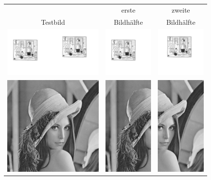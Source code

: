\documentclass[12pt,german]{article}
\begin{document}
\begin{table}[H]
  \centering
  \begin{tabular}{| c | c | c |}
	\hline
	 & erste & zweite \\	
	Testbild & Bildhälfte & Bildhälfte \\ 
    \hline
    \includegraphics[width=5cm]{images/chop/binary1.jpg} &
    \includegraphics[width=2.5cm]{images/chop/binary1FH.jpg} &
    \includegraphics[width=2.5cm]{images/chop/binary1SH.jpg} \\
    \hline
    \includegraphics[width=5cm]{images/chop/lena.jpg} &
    \includegraphics[width=2.5cm]{images/chop/lenaFH.jpg} &
    \includegraphics[width=2.5cm]{images/chop/lenaSH.jpg} \\
    \hline
    

\end{tabular}
\end{table}
\end{document}
